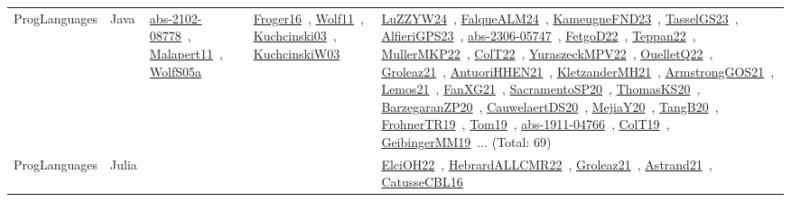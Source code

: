 {\begin{longtable}{lp{3cm}>{\raggedright\arraybackslash}p{6cm}>{\raggedright\arraybackslash}p{6cm}>{\raggedright\arraybackslash}p{8cm}}
\index{Java}\index{ProgLanguages!Java}ProgLanguages & Java & \href{../works/abs-2102-08778.pdf}{abs-2102-08778}~\cite{abs-2102-08778}, \href{../works/Malapert11.pdf}{Malapert11}~\cite{Malapert11}, \href{../works/WolfS05a.pdf}{WolfS05a}~\cite{WolfS05a} & \href{../works/Froger16.pdf}{Froger16}~\cite{Froger16}, \href{../works/Wolf11.pdf}{Wolf11}~\cite{Wolf11}, \href{../works/Kuchcinski03.pdf}{Kuchcinski03}~\cite{Kuchcinski03}, \href{../works/KuchcinskiW03.pdf}{KuchcinskiW03}~\cite{KuchcinskiW03} & \href{../works/LuZZYW24.pdf}{LuZZYW24}~\cite{LuZZYW24}, \href{../works/FalqueALM24.pdf}{FalqueALM24}~\cite{FalqueALM24}, \href{../works/KameugneFND23.pdf}{KameugneFND23}~\cite{KameugneFND23}, \href{../works/TasselGS23.pdf}{TasselGS23}~\cite{TasselGS23}, \href{../works/AlfieriGPS23.pdf}{AlfieriGPS23}~\cite{AlfieriGPS23}, \href{../works/abs-2306-05747.pdf}{abs-2306-05747}~\cite{abs-2306-05747}, \href{../works/FetgoD22.pdf}{FetgoD22}~\cite{FetgoD22}, \href{../works/Teppan22.pdf}{Teppan22}~\cite{Teppan22}, \href{../works/MullerMKP22.pdf}{MullerMKP22}~\cite{MullerMKP22}, \href{../works/ColT22.pdf}{ColT22}~\cite{ColT22}, \href{../works/YuraszeckMPV22.pdf}{YuraszeckMPV22}~\cite{YuraszeckMPV22}, \href{../works/OuelletQ22.pdf}{OuelletQ22}~\cite{OuelletQ22}, \href{../works/Groleaz21.pdf}{Groleaz21}~\cite{Groleaz21}, \href{../works/AntuoriHHEN21.pdf}{AntuoriHHEN21}~\cite{AntuoriHHEN21}, \href{../works/KletzanderMH21.pdf}{KletzanderMH21}~\cite{KletzanderMH21}, \href{../works/ArmstrongGOS21.pdf}{ArmstrongGOS21}~\cite{ArmstrongGOS21}, \href{../works/Lemos21.pdf}{Lemos21}~\cite{Lemos21}, \href{../works/FanXG21.pdf}{FanXG21}~\cite{FanXG21}, \href{../works/SacramentoSP20.pdf}{SacramentoSP20}~\cite{SacramentoSP20}, \href{../works/ThomasKS20.pdf}{ThomasKS20}~\cite{ThomasKS20}, \href{../works/BarzegaranZP20.pdf}{BarzegaranZP20}~\cite{BarzegaranZP20}, \href{../works/CauwelaertDS20.pdf}{CauwelaertDS20}~\cite{CauwelaertDS20}, \href{../works/MejiaY20.pdf}{MejiaY20}~\cite{MejiaY20}, \href{../works/TangB20.pdf}{TangB20}~\cite{TangB20}, \href{../works/FrohnerTR19.pdf}{FrohnerTR19}~\cite{FrohnerTR19}, \href{../works/Tom19.pdf}{Tom19}~\cite{Tom19}, \href{../works/abs-1911-04766.pdf}{abs-1911-04766}~\cite{abs-1911-04766}, \href{../works/ColT19.pdf}{ColT19}~\cite{ColT19}, \href{../works/GeibingerMM19.pdf}{GeibingerMM19}~\cite{GeibingerMM19}... (Total: 69)\\
\index{Julia}\index{ProgLanguages!Julia}ProgLanguages & Julia &  &  & \href{../works/ElciOH22.pdf}{ElciOH22}~\cite{ElciOH22}, \href{../works/HebrardALLCMR22.pdf}{HebrardALLCMR22}~\cite{HebrardALLCMR22}, \href{../works/Groleaz21.pdf}{Groleaz21}~\cite{Groleaz21}, \href{../works/Astrand21.pdf}{Astrand21}~\cite{Astrand21}, \href{../works/CatusseCBL16.pdf}{CatusseCBL16}~\cite{CatusseCBL16}\\

\end{longtable}}
